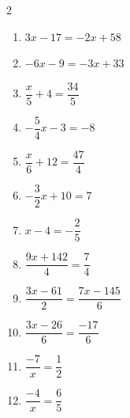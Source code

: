 \documentclass[11pt]{article}
\begin{document}
\begin{multicols}{2}
\begin{enumerate}
  \item $3x - 17 = -2x + 58$
  \vspace{2.0cm}
  \item $-6x - 9 = -3x + 33$
  \vspace{2.0cm}
  \item $\dfrac{x}{5} + 4 = \dfrac{34}{5}$
  \vspace{2.0cm}
  \item $-\dfrac{5}{4}x - 3 = -8$
  \vspace{2.0cm}
  \item $\dfrac{x}{6} + 12 = \dfrac{47}{4}$
  \vspace{2.0cm}
  \item $-\dfrac{3}{2}x + 10 = 7$
  \vspace{2.0cm}
  \item $x - 4 = -\dfrac{2}{5}$
  \vspace{2.0cm}
  \item $\dfrac{9x + 142}{4} = \dfrac{7}{4}$
  \vspace{2.0cm}
  \item $\dfrac{3x - 61}{2} = \dfrac{7x - 145}{6}$
  \vspace{2.0cm}
  \item $\dfrac{3x - 26}{6} = \dfrac{-17}{6}$
  \vspace{2.0cm}
  \item $\dfrac{-7}{x} = \dfrac{1}{2}$
  \vspace{2.0cm}
  \item $\dfrac{-4}{x} = \dfrac{6}{5}$
  \vspace{2.0cm}
\end{enumerate}
\end{multicols}
\end{document}
